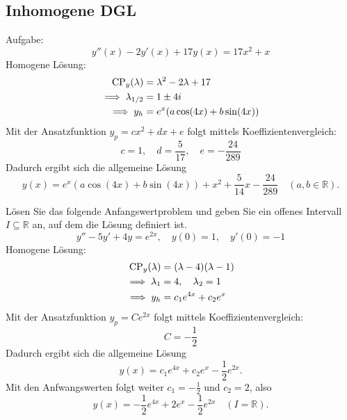 \documentclass[parskip=full]{scrartcl}
\begin{document}
\subsection{Inhomogene DGL}
Aufgabe:
\begin{displaymath}
  y''(x) - 2y'(x) + 17y(x) = 17x^2 + x
\end{displaymath}
Homogene Lösung:
\begin{align*}
  \operatorname{CP}_y(\lambda) &= \lambda^2 - 2\lambda + 17\\
  \implies \lambda_{1/2} &= 1 \pm 4i\\
  \implies y_h &= e^x(a \cos(4x) + b \sin(4x))
\end{align*}
Mit der Ansatzfunktion $y_p = cx^2 + dx + e$ folgt mittels Koeffizientenvergleich:
\begin{displaymath}
  c = 1, \quad d = \frac{5}{17}, \quad e = -\frac{24}{289}
\end{displaymath}
Dadurch ergibt sich die allgemeine Lösung
\begin{displaymath}
  y(x) = e^x(a \cos(4x) + b \sin(4x)) + x^2 + \frac{5}{14}x - \frac{24}{289} \quad (a,b \in \mathbb{R}).
\end{displaymath}

Lösen Sie das folgende Anfangswertproblem und geben Sie ein offenes Intervall $I \subseteq \mathbb{R}$ an, auf dem die Lösung definiert ist.
\begin{displaymath}
  y'' - 5y' + 4y = e^{2x}, \quad y(0) = 1, \quad y'(0) = -1
\end{displaymath}
Homogene Lösung:
\begin{align*}
  \operatorname{CP}_y(\lambda) &= (\lambda - 4)(\lambda - 1)\\
  \implies \lambda_1 &= 4, \quad \lambda_2 = 1\\
  \implies y_h &= c_1 e^{4x} + c_2 e^{x}
\end{align*}
Mit der Ansatzfunktion $y_p = Ce^{2x}$ folgt mittels Koeffizientenvergleich:
\begin{displaymath}
  C = -\frac{1}{2}
\end{displaymath}
Dadurch ergibt sich die allgemeine Lösung
\begin{displaymath}
  y(x) = c_1 e^{4x} + c_2 e^{x} - \frac{1}{2}e^{2x}.
\end{displaymath}
Mit den Anfwangswerten folgt weiter $c_1 = -\frac{1}{2}$ und $c_2 = 2$, also
\begin{displaymath}
  y(x) = -\frac{1}{2} e^{4x} + 2 e^{x} - \frac{1}{2}e^{2x} \quad (I = \mathbb{R}).
\end{displaymath}
\end{document}
